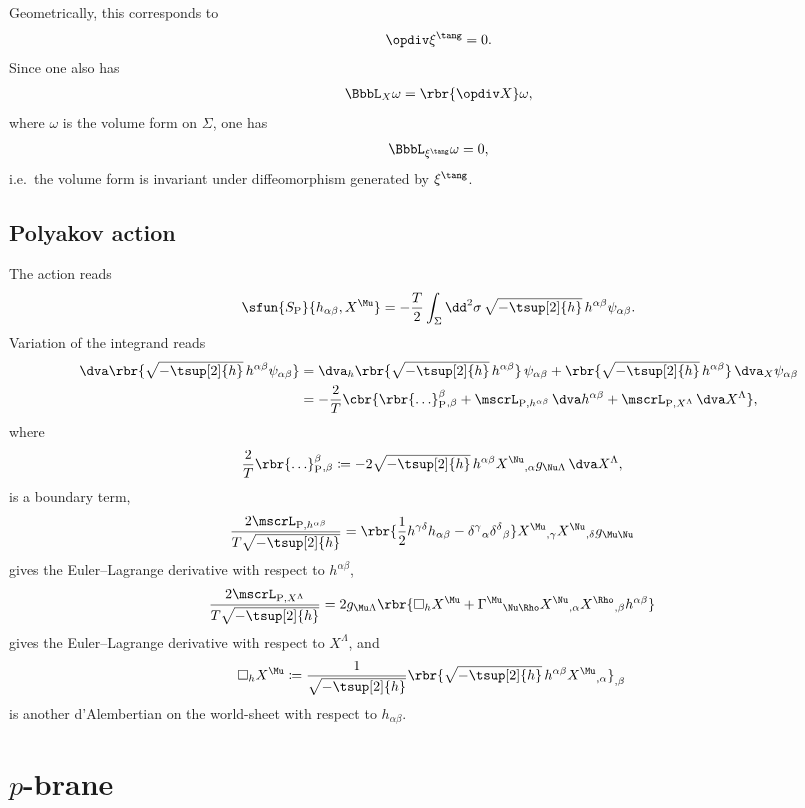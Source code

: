 \documentclass[a4paper,11pt]{article}
\begin{document}
Geometrically, this corresponds to
\begin{align}
	\opdiv \xi^{\tang} = 0.
\end{align}
Since one also has
\begin{align}
	\BbbL_X \omega = \rbr{\opdiv X} \omega,
\end{align}
where $\omega$ is the volume form on $\Sigma$, one has 
\begin{align}
	\BbbL_{\xi^{\tang}} \omega = 0,
\end{align}
i.e.\ the volume form is invariant under diffeomorphism generated by 
$\xi^{\tang}$.

\subsection{Polyakov action}
\label{sec:bos-str-pol}

The action reads \cite{Deser_1976,Brink_1976,Polyakov1981}
\begin{align}
\sfun{S_\text{P}}{h_{\alpha\beta}, X^{\Mu}} = -\frac{T}{2} \int_{\Sigma}
\dd^2 \sigma\, \sqrt{-\tsup[2]{h}}\, h^{\alpha\beta} \psi_{\alpha\beta}.
\end{align}
Variation of the integrand reads
\begin{align}
\dva \rbr{\sqrt{-\tsup[2]{h}}\, h^{\alpha\beta} \psi_{\alpha\beta}}
&= \dva_h \rbr{\sqrt{-\tsup[2]{h}}\, h^{\alpha\beta}}\, \psi_{\alpha\beta}
+ \rbr{\sqrt{-\tsup[2]{h}}\, h^{\alpha\beta}}\, \dva_X  \psi_{\alpha\beta}
\nonumber \\
&= - \frac{2}{T} \cbr{ \rbr{\ldots}_{\text{P}}^{\beta}{}_{,\beta} + 
\mscrL_{\text{P}, h^{\alpha\beta}}\, \dva h^{\alpha\beta} +
\mscrL_{\text{P}, X^{\Lambda}}\, \dva X^{\Lambda} },
\end{align}
where
\begin{align}
\frac{2}{T} \rbr{\ldots}_{\text{P}}^{\beta}{}_{,\beta} &\coloneqq
- 2\sqrt{-\tsup[2]{h}}\, 
h^{\alpha\beta} X^{\Nu}{}_{,\alpha} g_{\Nu\Lambda}\,\dva X^{\Lambda},
\end{align}
is a boundary term,
\begin{align}
\frac{2\mscrL_{\text{P}, h^{\alpha\beta}}}{T \sqrt{-\tsup[2]{h}}} &= 
\rbr{\frac{1}{2} h^{\gamma\delta} h_{\alpha\beta} -
	\delta^{\gamma}{}_{\alpha} \delta^{\delta}{}_{\beta}}
X^{\Mu}{}_{,\gamma} X^{\Nu}{}_{,\delta} g_{\Mu\Nu}
\end{align}
gives the Euler--Lagrange derivative with respect to $h^{\alpha\beta}$,
\begin{align}
\frac{2 \mscrL_{\text{P}, X^{\Lambda}}}{T\sqrt{-\tsup[2]{h}}}  &= 2
g_{\Mu\Lambda}\rbr{\square_h X^{\Mu} +
\Gamma^{\Mu}{}_{\Nu\Rho} X^{\Nu}{}_{,\alpha} X^{\Rho}{}_{,\beta} 
h^{\alpha\beta}}
\end{align}
gives the Euler--Lagrange derivative with respect to $X^{\Lambda}$, and
\begin{align}
\square_h X^{\Mu} &\coloneqq
\frac{1}{\sqrt{-\tsup[2]{h}}} \rbr{\sqrt{-\tsup[2]{h}}\, 
	h^{\alpha\beta} X^{\Mu}{}_{,\alpha}}_{,\beta}
\end{align}
is another d'Alembertian on the world-sheet with respect to $h_{\alpha\beta}$.



\section{$p$-brane}
\label{sec:p-bra}

\cite{Anciaux2010}

\printbibliography
\end{document}
